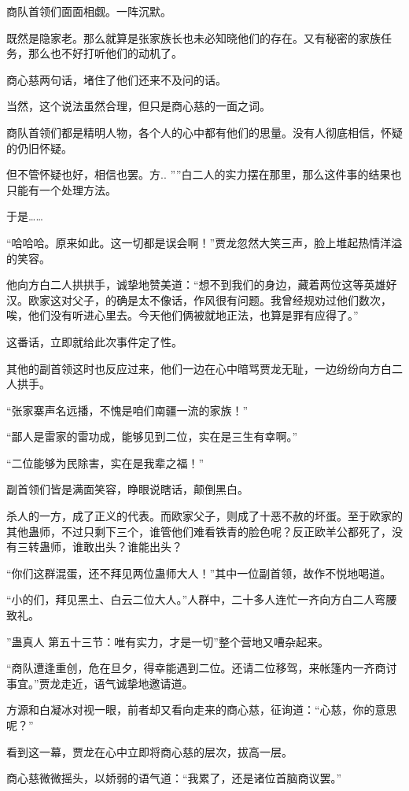 \begin{this_body}
商队首领们面面相觑。一阵沉默。

既然是隐家老。那么就算是张家族长也未必知晓他们的存在。又有秘密的家族任务，那么也不好打听他们的动机了。

商心慈两句话，堵住了他们还来不及问的话。

当然，这个说法虽然合理，但只是商心慈的一面之词。

商队首领们都是精明人物，各个人的心中都有他们的思量。没有人彻底相信，怀疑的仍旧怀疑。

但不管怀疑也好，相信也罢。方.. ””白二人的实力摆在那里，那么这件事的结果也只能有一个处理方法。

于是……

“哈哈哈。原来如此。这一切都是误会啊！”贾龙忽然大笑三声，脸上堆起热情洋溢的笑容。

他向方白二人拱拱手，诚挚地赞美道：“想不到我们的身边，藏着两位这等英雄好汉。欧家这对父子，的确是太不像话，作风很有问题。我曾经规劝过他们数次，唉，他们没有听进心里去。今天他们俩被就地正法，也算是罪有应得了。”

这番话，立即就给此次事件定了性。

其他的副首领这时也反应过来，他们一边在心中暗骂贾龙无耻，一边纷纷向方白二人拱手。

“张家寨声名远播，不愧是咱们南疆一流的家族！”

“鄙人是雷家的雷功成，能够见到二位，实在是三生有幸啊。”

“二位能够为民除害，实在是我辈之福！”

副首领们皆是满面笑容，睁眼说瞎话，颠倒黑白。

杀人的一方，成了正义的代表。而欧家父子，则成了十恶不赦的坏蛋。至于欧家的其他蛊师，不过只剩下三个，谁管他们难看铁青的脸色呢？反正欧羊公都死了，没有三转蛊师，谁敢出头？谁能出头？

“你们这群混蛋，还不拜见两位蛊师大人！”其中一位副首领，故作不悦地喝道。

“小的们，拜见黑土、白云二位大人。”人群中，二十多人连忙一齐向方白二人弯腰致礼。

”蛊真人 第五十三节：唯有实力，才是一切”整个营地又嘈杂起来。

“商队遭逢重创，危在旦夕，得幸能遇到二位。还请二位移驾，来帐篷内一齐商讨事宜。”贾龙走近，语气诚挚地邀请道。

方源和白凝冰对视一眼，前者却又看向走来的商心慈，征询道：“心慈，你的意思呢？”

看到这一幕，贾龙在心中立即将商心慈的层次，拔高一层。

商心慈微微摇头，以娇弱的语气道：“我累了，还是诸位首脑商议罢。”


\end{this_body}
